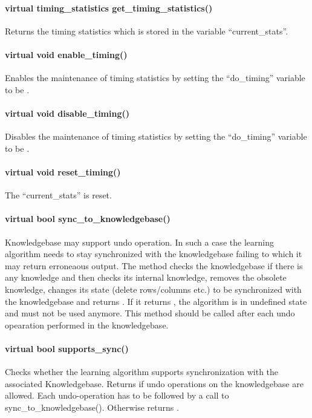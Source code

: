 \paragraph{virtual timing\_statistics get\_timing\_statistics()}
Returns the timing statistics which is stored in the variable ``current\_stats''.

\paragraph{virtual void enable\_timing()}
Enables the maintenance of timing statistics by setting the ``do\_timing'' variable to be \true.

\paragraph{virtual void disable\_timing()}
Disables the maintenance of timing statistics by setting the ``do\_timing'' variable to be \false.

\paragraph{virtual void reset\_timing()}
The ``current\_stats'' is reset.

\paragraph{virtual bool sync\_to\_knowledgebase()}
Knowledgebase may support undo operation. In such a case the learning algorithm needs to stay synchronized with the knowledgebase failing to which it may return erroneaous output. The method checks the knowledgebase if there is any knowledge and then checks its internal knowledge, removes the obsolete knowledge, changes its state (delete rows/columns etc.) to be synchronized with the knowledgebase and returns \true. If it returns \false, the algorithm is in undefined state and must not be used anymore. This method should be called after each undo opearation performed in the knowledgebase.

\paragraph{virtual bool supports\_sync()}
 Checks whether the learning algorithm supports synchronization with the associated Knowledgebase. Returns \true if undo operations on the knowledgebase are allowed. Each undo-operation has to be followed by a call to sync\_to\_knowledgebase(). Otherwise returns \false.

